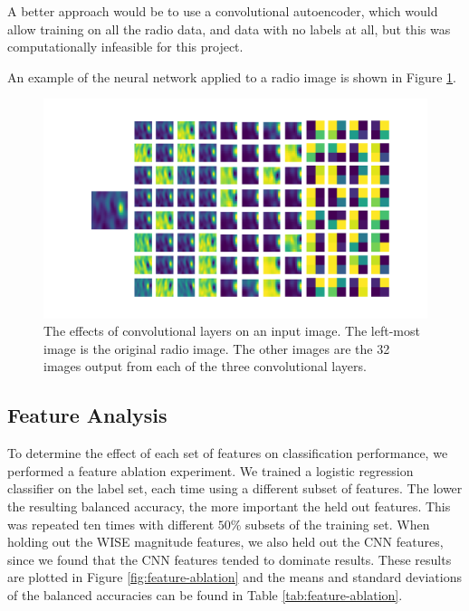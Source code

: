       A better approach would be to use a convolutional autoencoder, which would
      allow training on all the radio data, and data with no labels at all, but
      this was computationally infeasible for this project.

      An example of the neural network applied to a radio image is shown in
      Figure \ref{fig:rgz-cnn}.

      \begin{figure}[!ht]
        \centering
        \includegraphics[width=\textwidth]{images/rgz_cnn}
        \caption{The effects of convolutional layers on an input image. The
          left-most image is the original radio image. The other images are the
          32 images output from each of the three convolutional layers.}
        \label{fig:rgz-cnn}
      \end{figure}

  \subsection{Feature Analysis}
  \label{sec:feature-analysis}

    To determine the effect of each set of features on classification
    performance, we performed a feature ablation experiment. We trained a
    logistic regression classifier on the \citeauthor{norris06} label set, each
    time using a different subset of features. The lower the resulting balanced
    accuracy, the more important the held out features. This was repeated ten
    times with different $50\%$ subsets of the training set. When holding out
    the WISE magnitude features, we also held out the CNN features, since we
    found that the CNN features tended to dominate results. These results are
    plotted in Figure \ref{fig:feature-ablation} and the means and standard
    deviations of the balanced accuracies can be found in Table
    \ref{tab:feature-ablation}.

